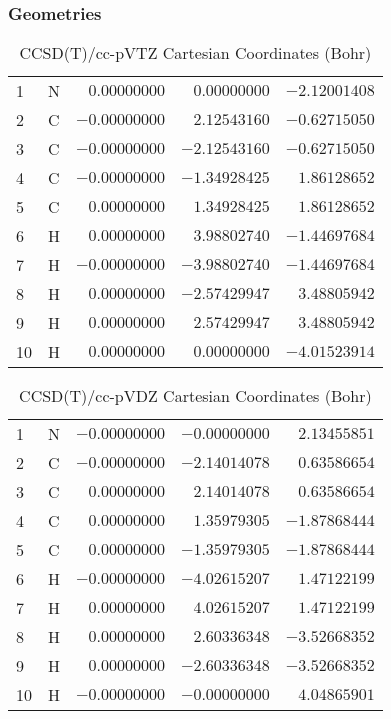 \documentclass[10pt,oneside]{article}
\begin{document}
\subsubsection*{Geometries}
\begin{table}[h!]
\centering
\caption{CCSD(T)/cc-pVTZ Cartesian Coordinates (Bohr)}
\begin{tabular}{llrrr}
1  & N  & $ 0.00000000$ & $ 0.00000000$ & $-2.12001408$ \\
2  & C  & $-0.00000000$ & $ 2.12543160$ & $-0.62715050$ \\
3  & C  & $-0.00000000$ & $-2.12543160$ & $-0.62715050$ \\
4  & C  & $-0.00000000$ & $-1.34928425$ & $ 1.86128652$ \\
5  & C  & $ 0.00000000$ & $ 1.34928425$ & $ 1.86128652$ \\
6  & H  & $ 0.00000000$ & $ 3.98802740$ & $-1.44697684$ \\
7  & H  & $-0.00000000$ & $-3.98802740$ & $-1.44697684$ \\
8  & H  & $ 0.00000000$ & $-2.57429947$ & $ 3.48805942$ \\
9  & H  & $ 0.00000000$ & $ 2.57429947$ & $ 3.48805942$ \\
10 & H  & $ 0.00000000$ & $ 0.00000000$ & $-4.01523914$ \\
\end{tabular}
\end{table}

\begin{table}[h!]
\centering
\caption{CCSD(T)/cc-pVDZ Cartesian Coordinates (Bohr)}
\begin{tabular}{llrrr}
1  & N  & $-0.00000000$ & $-0.00000000$ & $ 2.13455851$ \\
2  & C  & $-0.00000000$ & $-2.14014078$ & $ 0.63586654$ \\
3  & C  & $ 0.00000000$ & $ 2.14014078$ & $ 0.63586654$ \\
4  & C  & $ 0.00000000$ & $ 1.35979305$ & $-1.87868444$ \\
5  & C  & $ 0.00000000$ & $-1.35979305$ & $-1.87868444$ \\
6  & H  & $-0.00000000$ & $-4.02615207$ & $ 1.47122199$ \\
7  & H  & $ 0.00000000$ & $ 4.02615207$ & $ 1.47122199$ \\
8  & H  & $ 0.00000000$ & $ 2.60336348$ & $-3.52668352$ \\
9  & H  & $ 0.00000000$ & $-2.60336348$ & $-3.52668352$ \\
10 & H  & $-0.00000000$ & $-0.00000000$ & $ 4.04865901$ \\
\end{tabular}
\end{table}
\end{document}
